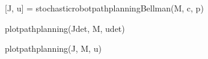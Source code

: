 \documentclass[
]{article}
\newenvironment{Shaded}{\begin{snugshade}}{\end{snugshade}}
\newcommand{\NormalTok}[1]{\textcolor[rgb]{0.00,0.23,0.31}{#1}}
\newcommand{\OperatorTok}[1]{\textcolor[rgb]{0.37,0.37,0.37}{#1}}
\begin{document}
\begin{Shaded}
\begin{Highlighting}[]
\NormalTok{[J, u] }\OperatorTok{=}\NormalTok{ stochasticrobotpathplanningBellman(M, c, p)}
\end{Highlighting}
\end{Shaded}

\begin{Shaded}
\begin{Highlighting}[]
\NormalTok{plotpathplanning(Jdet, M, udet)}
\end{Highlighting}
\end{Shaded}

\begin{Shaded}
\begin{Highlighting}[]
\NormalTok{plotpathplanning(J, M, u)}
\end{Highlighting}
\end{Shaded}
\end{document}
